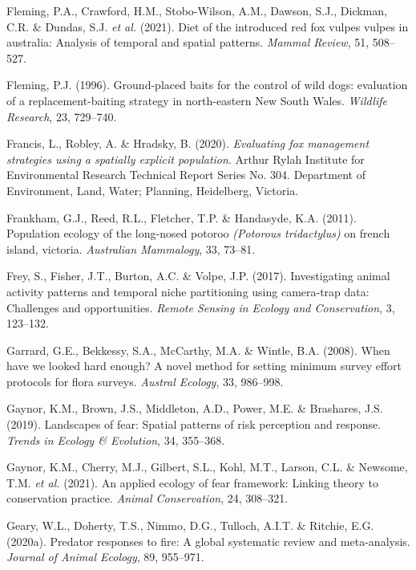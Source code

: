 \documentclass[11pt,a4paper,titlepage,twoside,openright]{style/unimelbthesis}
\begin{document}
\begin{mainmatter}
\leavevmode\hypertarget{ref-fleming2021diet}{}%
Fleming, P.A., Crawford, H.M., Stobo-Wilson, A.M., Dawson, S.J., Dickman, C.R. \& Dundas, S.J. \emph{et al.} (2021). Diet of the introduced red fox vulpes vulpes in australia: Analysis of temporal and spatial patterns. \emph{Mammal Review}, 51, 508--527.

\leavevmode\hypertarget{ref-fleming1996ground}{}%
Fleming, P.J. (1996). Ground-placed baits for the control of wild dogs: evaluation of a replacement-baiting strategy in north-eastern New South Wales. \emph{Wildlife Research}, 23, 729--740.

\leavevmode\hypertarget{ref-francis2020evaluating}{}%
Francis, L., Robley, A. \& Hradsky, B. (2020). \emph{Evaluating fox management strategies using a spatially explicit population}. Arthur Rylah Institute for Environmental Research Technical Report Series No. 304. Department of Environment, Land, Water; Planning, Heidelberg, Victoria.

\leavevmode\hypertarget{ref-frankham2011population}{}%
Frankham, G.J., Reed, R.L., Fletcher, T.P. \& Handasyde, K.A. (2011). Population ecology of the long-nosed potoroo \emph{(Potorous tridactylus)} on french island, victoria. \emph{Australian Mammalogy}, 33, 73--81.

\leavevmode\hypertarget{ref-frey2017investigating}{}%
Frey, S., Fisher, J.T., Burton, A.C. \& Volpe, J.P. (2017). Investigating animal activity patterns and temporal niche partitioning using camera-trap data: Challenges and opportunities. \emph{Remote Sensing in Ecology and Conservation}, 3, 123--132.

\leavevmode\hypertarget{ref-garrard2008when}{}%
Garrard, G.E., Bekkessy, S.A., McCarthy, M.A. \& Wintle, B.A. (2008). When have we looked hard enough? A novel method for setting minimum survey effort protocols for flora surveys. \emph{Austral Ecology}, 33, 986--998.

\leavevmode\hypertarget{ref-gaynor2019landscapes}{}%
Gaynor, K.M., Brown, J.S., Middleton, A.D., Power, M.E. \& Brashares, J.S. (2019). Landscapes of fear: Spatial patterns of risk perception and response. \emph{Trends in Ecology \& Evolution}, 34, 355--368.

\leavevmode\hypertarget{ref-gaynor2021applied}{}%
Gaynor, K.M., Cherry, M.J., Gilbert, S.L., Kohl, M.T., Larson, C.L. \& Newsome, T.M. \emph{et al.} (2021). An applied ecology of fear framework: Linking theory to conservation practice. \emph{Animal Conservation}, 24, 308--321.

\leavevmode\hypertarget{ref-geary2020predator}{}%
Geary, W.L., Doherty, T.S., Nimmo, D.G., Tulloch, A.I.T. \& Ritchie, E.G. (2020a). Predator responses to fire: A global systematic review and meta-analysis. \emph{Journal of Animal Ecology}, 89, 955--971.


\end{mainmatter}
\end{document}
